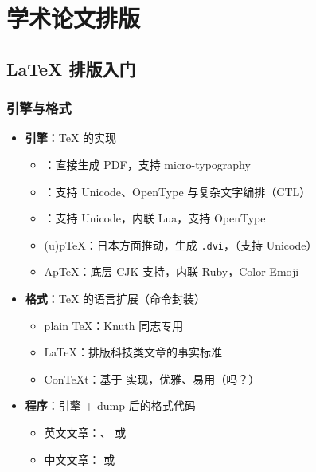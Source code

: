 

\section{学术论文排版}
\subsection{\LaTeX{} 排版入门}

\begin{frame}[fragile]
  \frametitle{引擎与格式}
  \begin{itemize}
    \item \textbf{引擎}：\TeX{} 的实现

          \begin{itemize}
            \item \pdfTeX{}：直接生成 PDF，支持 micro-typography
            \item \XeTeX{}：支持 Unicode、OpenType 与复杂文字编排（CTL）
            \item \LuaTeX{}：支持 Unicode，内联 Lua，支持 OpenType
            \item (u)p\TeX{}：日本方面推动，生成 \verb|.dvi|，（支持 Unicode）
            \item Ap\TeX{}：底层 CJK 支持，内联 Ruby，Color Emoji
          \end{itemize}

    \item \textbf{格式}：\TeX{} 的语言扩展（命令封装）

          \begin{itemize}
            \item plain \TeX{}：Knuth 同志专用
            \item \LaTeX{}：排版科技类文章的事实标准
            \item Con\TeX t：基于 \LuaTeX{} 实现，优雅、易用（吗？）
          \end{itemize}

    \item \textbf{程序}：引擎 + dump 后的格式代码

          \begin{itemize}
            \item \alert{英文文章：\pdfLaTeX{}、\XeLaTeX{} 或 \LuaLaTeX{}}
            \item \alert{中文文章：\XeLaTeX{} 或 \LuaLaTeX{}}
          \end{itemize}
  \end{itemize}
\end{frame}


